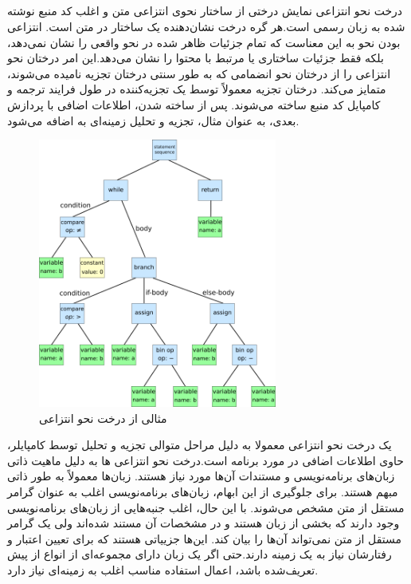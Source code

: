 \subsection {}
درخت نحو انتزاعی نمایش درختی از ساختار نحوی انتزاعی متن و اغلب کد منبع نوشته شده به زبان رسمی است.هر گره درخت نشان‌دهنده یک ساختار در متن است.
انتزاعی بودن نحو به این معناست که تمام جزئیات ظاهر شده در نحو واقعی را نشان نمی‌دهد، بلکه فقط جزئیات ساختاری یا مرتبط با محتوا را نشان می‌دهد.این امر درختان نحو انتزاعی را از درختان نحو انضمامی که به طور سنتی درختان تجزیه نامیده می‌شوند، متمایز می‌کند. درختان تجزیه معمولاً توسط یک تجزیه‌کننده در طول فرایند ترجمه و کامپایل کد منبع ساخته می‌شوند. پس از ساخته شدن، اطلاعات اضافی با پردازش بعدی، به عنوان مثال، تجزیه و تحلیل زمینه‌ای به  اضافه می‌شود.
\begin{figure}[H]
	\centering
	\includegraphics[width=0.7\textwidth]{figures/AST.png}
	\caption{مثالی از درخت نحو انتزاعی }
	\label{fig:AST}
\end{figure}
\clearpage

یک درخت نحو انتزاعی  معمولا به دلیل مراحل متوالی تجزیه و تحلیل توسط کامپایلر، حاوی اطلاعات اضافی در مورد برنامه است.درخت نحو انتزاعی ها به دلیل ماهیت ذاتی زبان‌های برنامه‌نویسی و مستندات آن‌ها مورد نیاز هستند. زبان‌ها معمولاً به طور ذاتی مبهم هستند. برای جلوگیری از این ابهام، زبان‌های برنامه‌نویسی اغلب به عنوان گرامر مستقل از متن  مشخص می‌شوند. با این حال، اغلب جنبه‌هایی از زبان‌های برنامه‌نویسی وجود دارند که بخشی از زبان هستند و در مشخصات آن مستند شده‌اند ولی یک گرامر مستقل از متن  نمی‌تواند آن‌ها را بیان کند. این‌ها جزییاتی هستند که برای تعیین اعتبار و رفتارشان نیاز به یک زمینه دارند.حتی اگر یک زبان دارای مجموعه‌ای از انواع از پیش تعریف‌شده باشد، اعمال استفاده مناسب اغلب به زمینه‌ای نیاز دارد.

